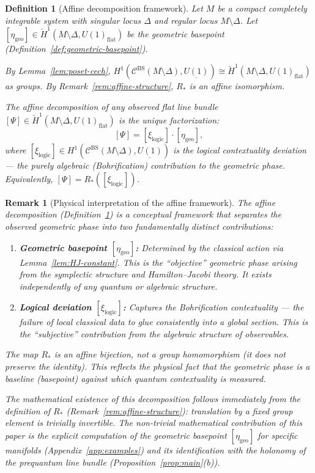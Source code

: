 \documentclass[11pt]{article}
\newtheorem{definition}[theorem]{Definition}
\newtheorem{remark}[theorem]{Remark}
\begin{document}
\begin{definition}[Affine decomposition framework]
\label{def:affine-decomposition}
Let $M$ be a compact completely integrable system with singular locus
$\Delta$ and regular locus $M \setminus \Delta$. Let
$[\eta_{\mathrm{geo}}] \in \check{H}^1(M \setminus \Delta, U(1)_{\mathrm{flat}})$
be the geometric basepoint (Definition~\ref{def:geometric-basepoint}).

By Lemma~\ref{lem:poset-cech}, $H^1(\mathcal{C}^{\mathrm{BS}}(M \setminus \Delta), \underline{U(1)})
\cong \check{H}^1(M \setminus \Delta, U(1)_{\mathrm{flat}})$ as groups.
By Remark~\ref{rem:affine-structure}, $R_*$ is an affine isomorphism.

The \emph{affine decomposition} of any observed flat line bundle $[\Psi] \in \check{H}^1(M \setminus \Delta, U(1)_{\mathrm{flat}})$
is the unique factorization:
\[
[\Psi] = [\xi_{\mathrm{logic}}] \cdot [\eta_{\mathrm{geo}}],
\]
where $[\xi_{\mathrm{logic}}] \in H^1(\mathcal{C}^{\mathrm{BS}}(M \setminus \Delta), \underline{U(1)})$
is the \emph{logical contextuality deviation} — the purely algebraic (Bohrification)
contribution to the geometric phase.
Equivalently, $[\Psi] = R_*([\xi_{\mathrm{logic}}])$.
\end{definition}

\begin{remark}[Physical interpretation of the affine framework]
\label{rem:framework-vs-theorem}
The affine decomposition (Definition~\ref{def:affine-decomposition}) is a \emph{conceptual framework} that separates the observed geometric phase into two fundamentally distinct contributions:
\begin{enumerate}
\item \textbf{Geometric basepoint $[\eta_{\mathrm{geo}}]$:} Determined by the classical action via Lemma~\ref{lem:HJ-constant}. This is the ``objective'' geometric phase arising from the symplectic structure and Hamilton--Jacobi theory. It exists independently of any quantum or algebraic structure.

\item \textbf{Logical deviation $[\xi_{\mathrm{logic}}]$:} Captures the Bohrification contextuality --- the failure of local classical data to glue consistently into a global section. This is the ``subjective'' contribution from the algebraic structure of observables.
\end{enumerate}

The map $R_*$ is an \emph{affine bijection, not a group homomorphism} (it does not preserve the identity). This reflects the physical fact that the geometric phase is a \emph{baseline} (basepoint) against which quantum contextuality is measured.

The mathematical existence of this decomposition follows immediately from the definition of $R_*$ (Remark~\ref{rem:affine-structure}): translation by a fixed group element is trivially invertible. The \emph{non-trivial mathematical contribution} of this paper is the explicit computation of the geometric basepoint $[\eta_{\mathrm{geo}}]$ for specific manifolds (Appendix~\ref{app:examples}) and its identification with the holonomy of the prequantum line bundle (Proposition~\ref{prop:main}(b)).
\end{remark}
\end{document}
